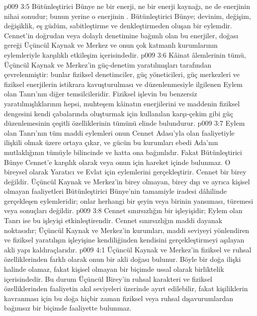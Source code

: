\vs p009 3:5 Bütünleştirici Bünye ne bir enerji, ne bir enerji kaynağı, ne de enerjinin nihai sonudur; bunun yerine o enerjinin . Bütünleştirici Bünye; devinim, değişim, değişiklik, eş güdüm, sabitleştirme ve denkleştirmeden oluşan bir eylemdir. Cennet’in doğrudan veya dolaylı denetimine bağımlı olan bu enerjiler, doğası gereği Üçüncül Kaynak ve Merkez ve onun çok katmanlı kurumlarının eylemleriyle karşılıklı etkileşim içerisindedir.
\vs p009 3:6 Kâinat âlemlerinin tümü, Üçüncül Kaynak ve Merkez’in güç\hyp{}denetim yaratılmışları tarafından çevrelenmiştir: bunlar fiziksel denetimciler, güç yöneticileri, güç merkezleri ve fiziksel enerjilerin istikrara kavuşturulması ve düzenlenmesiyle ilgilenen Eylem olan Tanrı’nın diğer temsilcileridir. Fiziksel işlevin bu benzersiz yaratılmışlıklarının hepsi, muhteşem kâinatın enerjilerini ve maddenin fiziksel dengesini kendi çabalarında oluşturmak için kullanılan karşı\hyp{}çekim gibi güç düzenlemesinin çeşitli özelliklerinin tümünü elinde bulundurur.
\vs p009 3:7 Eylem olan Tanrı’nın tüm maddi eylemleri onun Cennet Adası’yla olan faaliyetiyle ilişkili olmak üzere ortaya çıkar, ve gücün bu kurumları ebedi Ada’nın mutlaklığının tümüyle bilincinde ve hatta ona bağımlıdır. Fakat Bütünleştirici Bünye Cennet’e karşılık olarak veya onun için hareket içinde bulunmaz. O bireysel olarak Yaratıcı ve Evlat için eylemlerini gerçekleştirir. Cennet bir birey değildir. Üçüncül Kaynak ve Merkez’in birey olmayan, birey dışı ve ayrıca kişisel olmayan faaliyetleri Bütünleştirici Bünye’nin tamamiyle iradesi dâhilinde gerçekleşen eylemleridir; onlar herhangi bir şeyin veya birinin yansıması, türemesi veya sonuçları değildir.
\vs p009 3:8 Cennet sınırsızlığın bir işleyişidir; Eylem olan Tanrı ise bu işleyişi etkinleştirendir. Cennet sınırsızlığın maddi dayanak noktasıdır; Üçüncül Kaynak ve Merkez’in kurumları, maddi seviyeyi yönlendiren ve fiziksel yaratılışın işleyişine kendiliğinden kendisini gerçekleştirmeyi aşılayan akli yapı kaldıraçlarıdır.
\vs p009 4:1 Üçüncül Kaynak ve Merkez’in fiziksel ve ruhsal özelliklerinden farklı olarak onun bir akli doğası bulunur. Böyle bir doğa ilişki halinde olamaz, fakat kişisel olmayan bir biçimde ussal olarak birliktelik içerisindedir. Bu durum Üçüncül Birey’in ruhsal karakteri ve fiziksel özelliklerinden faaliyetin akıl seviyeleri üzerinde ayırt edilebilir, fakat kişiliklerin kavranması için bu doğa hiçbir zaman fiziksel veya ruhsal dışavurumlardan bağımsız bir biçimde faaliyette bulunmaz.
